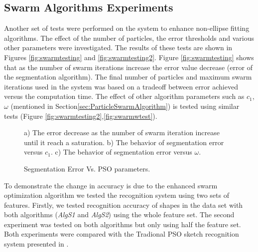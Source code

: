 \documentclass[preprint,1p,times,review]{elsarticle}
\begin{document}
 \subsection{Swarm Algorithms Experiments}

 Another set of tests were performed on the system to enhance non-ellipse fitting algorithms. The effect of the number of particles, the error thresholds and various other parameters were investigated. The results of these tests are shown in Figures \ref{fig:swarmtesting} and   \ref{fig:swarmtesting2}. Figure \ref{fig:swarmtesting} shows that as the number of swarm iterations increase the error value decrease (error of the segmentation algorithm). The final number of particles and maximum swarm iterations used in the system was based on a tradeoff between error achieved versus the computation time. The effect of other algorithm parameters such as $c_1$, $\omega$ (mentioned in Section\ref{sec:ParticleSwarmAlgorithm}) is tested using similar tests (Figure \ref{fig:swarmtesting2},\ref{fig:swarmwtest}).%

 \begin{figure}
	\centering





	 	\caption{Segmentation Error Vs. PSO parameters.}a) The error
decrease as the number of swarm iteration increase until it reach a saturation.
 b) The behavior of segmentation error versus $c_1$. c) The behavior of
segmentation error versus  $\omega$.


\end{figure}



To demonstrate the change in accuracy is due to the enhanced swarm optimization algorithm we tested the recognition system using two sets of features. Firstly, we tested recognition accuracy of shapes in the data set with both algorithms (\textsl{AlgS1} and \textsl{AlgS2}) using the whole feature set. The second experiment was tested on both algorithms but only using half the feature set. Both experiments were compared with the Tradional PSO sketch recognition system presented in \cite{mypaper}.
\end{document}
